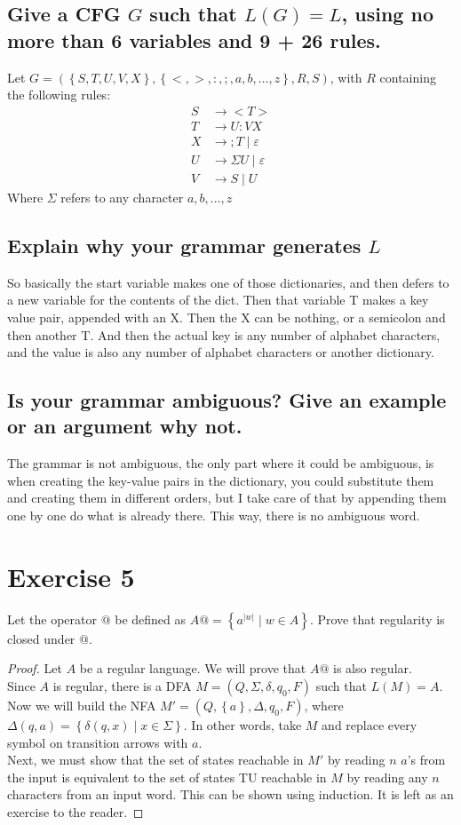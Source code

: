 \documentclass[a4paper,11pt]{article}
\newcommand{\Alphabet}{\Sigma}
\newcommand{\eps}{\varepsilon}
\newcommand{\set}[1]{\left\{ #1 \right\}}
\begin{document}
	\subsection{Give a CFG $G$ such that $L(G) = L$, using no more than 6 variables and 9 + 26 rules.}
	Let $G = (\set{S,T,U,V,X},\set{<,>,:,;,a,b,\dots,z},R,S)$, with $R$ containing the following rules:
	\begin{align*}
		S &\to <T>\\
		T &\to U:VX\\
		X &\to ;T \mid \eps\\
		U &\to \Alphabet U \mid \eps\\
		V &\to S \mid U
	\end{align*}
	Where $\Alphabet$ refers to any character $a,b,\dots,z$
	\subsection{Explain why your grammar generates $L$}
	So basically the start variable makes one of those dictionaries, and then defers to a new variable for the contents of the dict. Then that variable T makes a key value pair, appended with an X. Then the X can be nothing, or a semicolon and then another T. And then the actual key is any number of alphabet characters, and the value is also any number of alphabet characters or another dictionary.
	\subsection{Is your grammar ambiguous? Give an example or an argument why not.}
	The grammar is not ambiguous, the only part where it could be ambiguous, is when creating the key-value pairs in the dictionary, you could substitute them and creating them in different orders, but I take care of that by appending them one by one do what is already there. This way, there is no ambiguous word.
	\section{Exercise 5}
	Let the operator $@$ be defined as $A@=\set{a^{|w|}\mid w\in A}$. Prove that regularity is closed under $@$.
	\begin{proof}
		Let $A$ be a regular language. We will prove that $A@$ is also regular.\\
		Since $A$ is regular, there is a DFA $M=(Q,\Alphabet,\delta,q_0,F)$ such that $L(M) = A$. Now we will build the NFA $M'=(Q,\set{a},\Delta,q_0,F)$, where $\Delta(q,a) = \set{\delta(q,x)\mid x\in\Alphabet}$. In other words, take $M$ and replace every symbol on transition arrows with $a$.\\
		Next, we must show that the set of states reachable in $M'$ by reading $n$ $a$'s from the input is equivalent to the set of states TU	reachable in $M$ by reading any $n$ characters from an input word. This can be shown using induction. It is left as an exercise to the reader.
	\end{proof}
\end{document}
